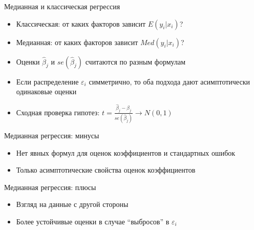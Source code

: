 \documentclass[ignorenonframetext,]{beamer}
\newcommand{\e}{\varepsilon}
\begin{document}
\begin{frame}{Медианная и классическая регрессия}

\begin{itemize}
\item
  Классическая: от каких факторов зависит \(E(y_i|x_i)\)?
\item
  Медианная: от каких факторов зависит \(Med(y_i|x_i)\)?
\item
  Оценки \(\hat{\beta}_j\) и \(se(\hat{\beta}_j)\) считаются по разным
  формулам
\item
  Если распределение \(\e_i\) симметрично, то оба подхода дают
  асимптотически одинаковые оценки
\item
  Сходная проверка гипотез:
  \(t=\frac{\hat{\beta}_j-\beta_j}{se(\hat{\beta}_j)} \to N(0,1)\)
\end{itemize}

\end{frame}

\begin{frame}{Медианная регрессия: минусы}

\begin{itemize}
\item
  Нет явных формул для оценок коэффициентов и стандартных ошибок
\item
  Только асимптотические свойства оценок коэффициентов
\end{itemize}

\end{frame}

\begin{frame}{Медианная регрессия: плюсы}

\begin{itemize}
\item
  Взгляд на данные с другой стороны
\item
  Более устойчивые оценки в случае ``выбросов'' в \(\e_i\)
\end{itemize}

\end{frame}
\end{document}
